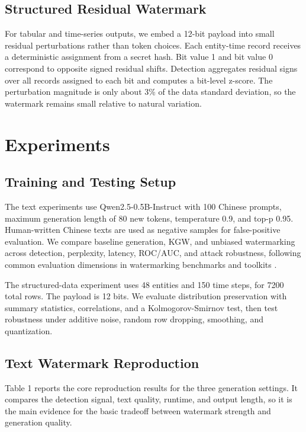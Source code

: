 \documentclass[11pt]{article}
\begin{document}
\subsection{Structured Residual Watermark}

For tabular and time-series outputs, we embed a 12-bit payload into small residual perturbations rather than token choices.
Each entity-time record receives a deterministic assignment from a secret hash.
Bit value 1 and bit value 0 correspond to opposite signed residual shifts.
Detection aggregates residual signs over all records assigned to each bit and computes a bit-level z-score.
The perturbation magnitude is only about 3\% of the data standard deviation, so the watermark remains small relative to natural variation.

\section{Experiments}

\subsection{Training and Testing Setup}

The text experiments use Qwen2.5-0.5B-Instruct \cite{qwen25} with 100 Chinese prompts, maximum generation length of 80 new tokens, temperature 0.9, and top-p 0.95.
Human-written Chinese texts are used as negative samples for false-positive evaluation.
We compare baseline generation, KGW, and unbiased watermarking across detection, perplexity, latency, ROC/AUC, and attack robustness, following common evaluation dimensions in watermarking benchmarks and toolkits \cite{markllm2024,survey2024}.

The structured-data experiment uses 48 entities and 150 time steps, for 7200 total rows.
The payload is 12 bits.
We evaluate distribution preservation with summary statistics, correlations, and a Kolmogorov-Smirnov test, then test robustness under additive noise, random row dropping, smoothing, and quantization.

\subsection{Text Watermark Reproduction}

Table 1 reports the core reproduction results for the three generation settings.
It compares the detection signal, text quality, runtime, and output length, so it is the main evidence for the basic tradeoff between watermark strength and generation quality.
\end{document}
